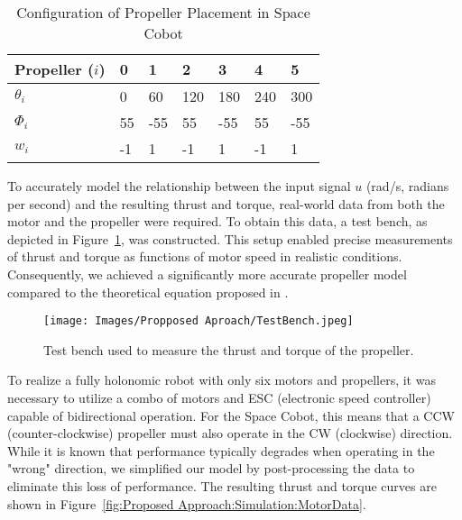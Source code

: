 \begin{table}[H]
\centering
\begin{tabular}{l|llllll}
Propeller (\(i\)) & 0  & 1   & 2   & 3    & 4   & 5   \\ \hline
\(\theta_{i}\)     & 0  & 60  & 120 & 180  & 240 & 300 \\
\(\Phi_{i}\)       & 55 & -55 & 55  & -55  & 55  & -55 \\
\(w_{i}\)          & -1 & 1   & -1  & 1    & -1  & 1   \\ \hline
\end{tabular}
\caption{Configuration of Propeller Placement in Space Cobot}
\label{tab:Proposed Aproach: Space Cobot Motor and propeller configuration}
\end{table}

To accurately model the relationship between the input signal \( u \) (rad/s, radians per second) and the resulting thrust and torque, real-world data from both the motor and the propeller were required. To obtain this data, a test bench, as depicted in Figure~\ref{fig:Proposed Approach:Simulator:Testbench}, was constructed. This setup enabled precise measurements of thrust and torque as functions of motor speed in realistic conditions. Consequently, we achieved a significantly more accurate propeller model compared to the theoretical equation proposed in \cite{martin2010true}.

\begin{figure}[H]
    \centering
    \texttt{[image: Images/Propposed Aproach/TestBench.jpeg]}
    \caption{Test bench used to measure the thrust and torque of the propeller.}
    \label{fig:Proposed Approach:Simulator:Testbench}
\end{figure}

To realize a fully holonomic robot with only six motors and propellers, it was necessary to utilize a combo of motors and ESC (electronic speed controller) capable of bidirectional operation. For the Space Cobot, this means that a CCW (counter-clockwise) propeller must also operate in the CW (clockwise) direction. While it is known that performance typically degrades when operating in the "wrong" direction, we simplified our model by post-processing the data to eliminate this loss of performance. The resulting thrust and torque curves are shown in Figure~\ref{fig:Proposed Approach:Simulation:MotorData}.

